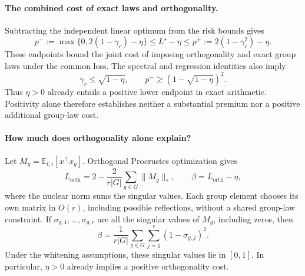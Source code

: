\paragraph{The combined cost of exact laws and orthogonality.}
Subtracting the independent linear optimum from the risk
bounds gives
\begin{equation}
 p^-:=\max\{0,2(1-\gamma_r)-\eta\}
 \le L^\star-\eta\le
 p^+:=2(1-\gamma_r^2)-\eta.
 \label{eq:risk-premium-main}
\end{equation}
These endpoints bound the joint cost of imposing
orthogonality and exact group laws under the common loss.
The spectral and regression identities also imply
\begin{equation}
 \gamma_r\le\sqrt{1-\eta},
 \qquad
 p^-\ge(1-\sqrt{1-\eta})^2.
 \label{eq:positivity-main}
\end{equation}
Thus $\eta>0$ already entails a positive lower endpoint
in exact arithmetic.
Positivity alone therefore establishes neither a substantial
premium nor a positive additional group-law cost.

\paragraph{How much does orthogonality alone explain?}
Let $M_g=\mathbb E_{t,i}[x^\top x_g]$.
Orthogonal Procrustes optimization
\citep{schonemann1966procrustes} gives
\[
 L_{\mathrm{orth}}
 =
 2-\frac{2}{r|G|}\sum_{g\in G}\|M_g\|_*,
 \qquad
 \beta=L_{\mathrm{orth}}-\eta,
\]
where the nuclear norm sums the singular values.
Each group element chooses its own matrix in $O(r)$,
including possible reflections, without a shared group-law
constraint.
If $\sigma_{g,1},\ldots,\sigma_{g,r}$ are all the singular
values of $M_g$, including zeros, then
\[
 \beta
 =
 \frac{1}{r|G|}
 \sum_{g\in G}\sum_{j=1}^{r}(1-\sigma_{g,j})^2.
\]
Under the whitening assumptions, these singular values lie
in $[0,1]$.
In particular, $\eta>0$ already implies a positive
orthogonality cost.

